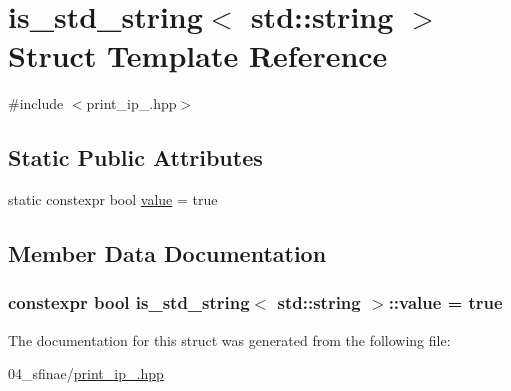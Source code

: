 \hypertarget{structis__std__string_3_01std_1_1string_01_4}{}\section{is\+\_\+std\+\_\+string$<$ std\+:\+:string $>$ Struct Template Reference}
\label{structis__std__string_3_01std_1_1string_01_4}


{\ttfamily \#include $<$print\+\_\+ip\+\_.\+hpp$>$}

\subsection*{Static Public Attributes}
\begin{DoxyCompactItemize}
\item 
static constexpr bool \hyperlink{structis__std__string_3_01std_1_1string_01_4_a6015b03af3ecea6f608daff279fee0af}{value} = true
\end{DoxyCompactItemize}


\subsection{Member Data Documentation}
\subsubsection[{\texorpdfstring{value}{value}}]{\setlength{\rightskip}{0pt plus 5cm}constexpr bool {\bf is\+\_\+std\+\_\+string}$<$ std\+::string $>$\+::value = true\hspace{0.3cm}{\ttfamily [static]}}\hypertarget{structis__std__string_3_01std_1_1string_01_4_a6015b03af3ecea6f608daff279fee0af}{}\label{structis__std__string_3_01std_1_1string_01_4_a6015b03af3ecea6f608daff279fee0af}


The documentation for this struct was generated from the following file\+:\begin{DoxyCompactItemize}
\item 
04\+\_\+sfinae/\hyperlink{print__ip__04_8hpp}{print\+\_\+ip\+\_.\+hpp}\end{DoxyCompactItemize}
